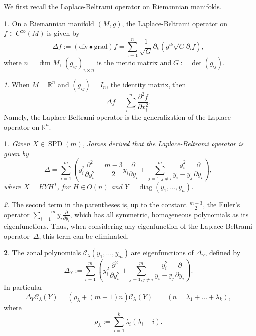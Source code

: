 \documentclass[10pt,oneside,american]{amsart}
\numberwithin{equation}{section}
\numberwithin{figure}{section}
\theoremstyle{definition}
\newtheorem{defn}{\protect\definitionname}[section]
\theoremstyle{remark}
\newtheorem{rem}{\protect\remarkname}[section]
\theoremstyle{plain}
\newtheorem{prop}{\protect\propositionname}[section]
\theoremstyle{definition}
\theoremstyle{plain}
\theoremstyle{plain}
\theoremstyle{plain}
\DeclareMathOperator{\diag}{diag}
\newcommand{\SPD}{\operatorname{SPD}}
\providecommand{\definitionname}{Definition}
\providecommand{\propositionname}{Proposition}
\providecommand{\remarkname}{Remark}
\begin{document}
We first recall the Laplace-Beltrami operator on Riemannian manifolds.
\begin{defn}
On a Riemannian manifold $\left(M,g\right)$, the Laplace-Beltrami
operator on $f\in C^{\infty}(M)$ is given by 
\[
\Delta f:=\left(\mathrm{div}\bullet\mathrm{grad}\right)f=\sum_{i=1}^{n}\frac{1}{\sqrt{G}}\partial_{k}\left(g^{ik}\sqrt{G}\partial_{i}f\right),
\]
where $n=\dim M$, $\left(g_{ij}\right)_{n\times n}$ is the metric
matrix and $G:=\det\left(g_{ij}\right)$. 
\end{defn}
\begin{rem}
When $M=\mathbb{R}^{n}$ and $\left(g_{ij}\right)=I_{n}$, the identity
matrix, then 
\[
\Delta f=\sum_{i=1}^{n}\frac{\partial^{2}f}{\partial x_{i}^{2}}.
\]
Namely, the Laplace-Beltrami operator is the generalization of the Laplace
operator on $\mathbb{R}^{n}$. 
\end{rem}
\begin{prop}
Given $X\in \SPD(m)$, James \cite[eq.~3.12, pp.~1712]{James1} derived
that the Laplace-Beltrami operator is given by
\[
\Delta=\sum_{i=1}^{m}\left(y_{i}^{2}\frac{\partial^{2}}{\partial y_{i}^{2}}-\frac{m-3}{2}y_{i}\frac{\partial}{\partial y_{i}}+\sum_{j=1,j\neq i}^{m}\frac{y_{i}^{2}}{y_{i}-y_{j}}\frac{\partial}{\partial y_{i}}\right),
\]
where $X=HYH^{T}$, for $H\in O(n)$ and $Y=\diag(y_{1},\ldots,y_{n})$. 
\end{prop}
\begin{rem}
The second term in the parentheses is, up to the constant $\frac{m-3}{2}$,
the Euler's operator $\overset{m}{\underset{i=1}{\sum}}y_{i}\frac{\partial}{\partial y_{i}}$,
which has all symmetric, homogeneous polynomials as its eigenfunctions.
Thus, when considering any eigenfunction of the Laplace-Beltrami operator~$\Delta$,
this term can be eliminated.
\end{rem}
\begin{defn}
The zonal polynomials $\mathcal{C}_{\lambda}(y_{1},\ldots,y_{m})$
are eigenfunctions of $\Delta_{Y}$, defined by
\[
  \Delta_{Y}:=\sum_{i=1}^{m}\left(y_{i}^{2}\frac{\partial^{2}}{\partial y_{i}^{2}}+\sum_{j=1,j\neq i}^{m}\frac{y_{i}^{2}}{y_{i}-y_{j}}\frac{\partial}{\partial y_{i}}\right).
\]
In particular
\[
  \Delta_{Y}\mathcal{C}_{\lambda}(Y)=\left(\rho_{\lambda}+(m-1)n\right)\mathcal{C}_{\lambda}(Y)
  \qquad (n=\lambda_1+\dots+\lambda_k),
\]
where
\begin{equation}
  \rho_{\lambda}:=\sum_{i=1}^{k}\lambda_{i}\left(\lambda_{i}-i\right).\label{eq:RHO}
\end{equation}
\end{defn}
\end{document}

